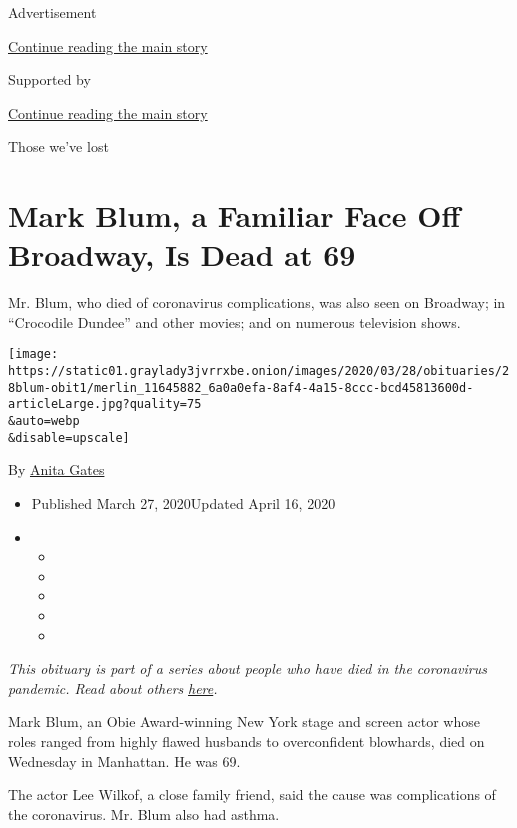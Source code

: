 Advertisement

\protect\hyperlink{after-top}{Continue reading the main story}

Supported by

\protect\hyperlink{after-sponsor}{Continue reading the main story}

Those we've lost

\hypertarget{mark-blum-a-familiar-face-off-broadway-is-dead-at-69}{%
\section{Mark Blum, a Familiar Face Off Broadway, Is Dead at
69}\label{mark-blum-a-familiar-face-off-broadway-is-dead-at-69}}

Mr. Blum, who died of coronavirus complications, was also seen on
Broadway; in ``Crocodile Dundee'' and other movies; and on numerous
television shows.

\texttt{[image: https://static01.graylady3jvrrxbe.onion/images/2020/03/28/obituaries/28blum-obit1/merlin\_11645882\_6a0a0efa-8af4-4a15-8ccc-bcd45813600d-articleLarge.jpg?quality=75\\\&auto=webp\\\&disable=upscale]}

By \href{https://www.nytimes3xbfgragh.onion/by/anita-gates}{Anita Gates}

\begin{itemize}
\item
  Published March 27, 2020Updated April 16, 2020
\item
  \begin{itemize}
  \item
  \item
  \item
  \item
  \item
  \end{itemize}
\end{itemize}

\emph{This obituary is part of a series about people who have died in
the coronavirus pandemic. Read about others}
\href{https://www.nytimes3xbfgragh.onion/series/people-who-have-died-of-the-coronavirus}{\emph{here}}\emph{.}

Mark Blum, an Obie Award-winning New York stage and screen actor whose
roles ranged from highly flawed husbands to overconfident blowhards,
died on Wednesday in Manhattan. He was 69.

The actor Lee Wilkof, a close family friend, said the cause was
complications of the coronavirus. Mr. Blum also had asthma.

